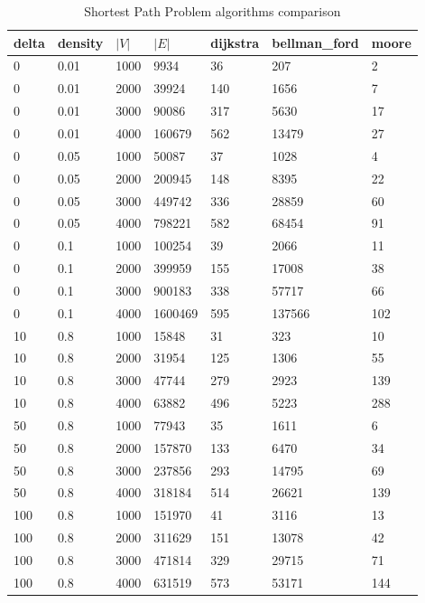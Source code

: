 \begin{table}[]
\begin{tabular}{lllllll}
delta & density & $|V| $& $|E|$  & dijkstra & bellman\_ford & moore \\ \hline
0     & 0.01    & 1000 & 9934    & 36       & 207           & 2     \\
0     & 0.01    & 2000 & 39924   & 140      & 1656          & 7     \\
0     & 0.01    & 3000 & 90086   & 317      & 5630          & 17    \\
0     & 0.01    & 4000 & 160679  & 562      & 13479         & 27    \\
0     & 0.05    & 1000 & 50087   & 37       & 1028          & 4     \\
0     & 0.05    & 2000 & 200945  & 148      & 8395          & 22    \\
0     & 0.05    & 3000 & 449742  & 336      & 28859         & 60    \\
0     & 0.05    & 4000 & 798221  & 582      & 68454         & 91    \\
0     & 0.1     & 1000 & 100254  & 39       & 2066          & 11    \\
0     & 0.1     & 2000 & 399959  & 155      & 17008         & 38    \\
0     & 0.1     & 3000 & 900183  & 338      & 57717         & 66    \\
0     & 0.1     & 4000 & 1600469 & 595      & 137566        & 102   \\
10    & 0.8     & 1000 & 15848   & 31       & 323           & 10    \\
10    & 0.8     & 2000 & 31954   & 125      & 1306          & 55    \\
10    & 0.8     & 3000 & 47744   & 279      & 2923          & 139   \\
10    & 0.8     & 4000 & 63882   & 496      & 5223          & 288   \\
50    & 0.8     & 1000 & 77943   & 35       & 1611          & 6     \\
50    & 0.8     & 2000 & 157870  & 133      & 6470          & 34    \\
50    & 0.8     & 3000 & 237856  & 293      & 14795         & 69    \\
50    & 0.8     & 4000 & 318184  & 514      & 26621         & 139   \\
100   & 0.8     & 1000 & 151970  & 41       & 3116          & 13    \\
100   & 0.8     & 2000 & 311629  & 151      & 13078         & 42    \\
100   & 0.8     & 3000 & 471814  & 329      & 29715         & 71    \\
100   & 0.8     & 4000 & 631519  & 573      & 53171         & 144
\end{tabular}
\caption{Shortest Path Problem algorithms comparison}\label{table:spp}
\end{table}

